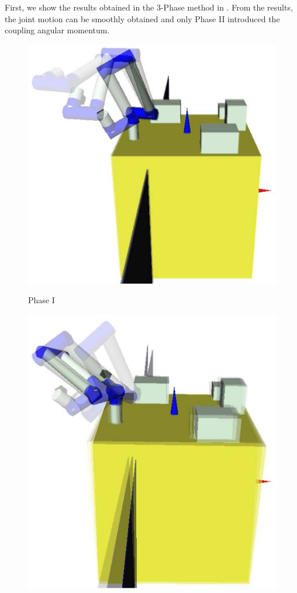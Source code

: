 First, we show the results obtained in the 3-Phase method in .
From the results,
the joint motion can be smoothly obtained and only Phase II introduced the coupling angular momentum.
%
\begin{figure}[t]
  \centering
  \begin{minipage}[h]{0.3\linewidth}
    \centering
    \includegraphics[width=1.0\linewidth]{fig/chapter4/PTP/phase1.eps}
    \footnotesize\par{Phase I}
  \end{minipage}
  \begin{minipage}[h]{0.3\linewidth}
    \centering
    \includegraphics[width=1.0\linewidth]{fig/chapter4/PTP/phase2.eps}

\end{minipage}
\end{figure}
